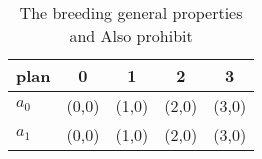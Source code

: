 \documentclass[a4paper]{article}
\begin{document}
\begin{table}
\begin{adjustbox}{width=0.6\columnwidth}
\begin{tabular}{|l|l|l|l|l|}
\hline
\textbf{plan} & \multicolumn{1}{c|}{\textbf{0}} & \multicolumn{1}{c|}{\textbf{1}} & \multicolumn{1}{c|}{\textbf{2}} & \multicolumn{1}{c|}{\textbf{3}} \\ \hline
\textbf{$a_0$}  & (0,0) & (1,0) & (2,0) & (3,0) \\ \hline
\textbf{$a_1$}  & (0,0) & (1,0) & (2,0) & (3,0) \\ \hline
\end{tabular}
\end{adjustbox}
\caption{The breeding general properties and Also prohibit
}
\end{table}
\end{document}
